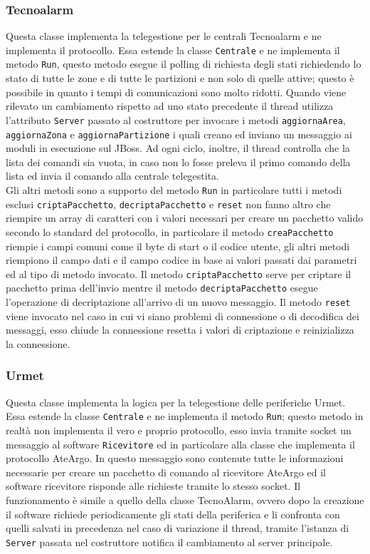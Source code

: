 \subsubsection{Tecnoalarm}
Questa classe implementa la telegestione per le centrali Tecnoalarm e ne implementa il protocollo. Essa estende la classe \texttt{Centrale} e ne implementa il metodo \texttt{Run}, questo metodo esegue il polling di richiesta degli stati richiedendo lo stato di tutte le zone e di tutte le partizioni e non solo di quelle attive; questo è possibile in quanto i tempi di comunicazioni sono molto ridotti. Quando viene rilevato un cambiamento rispetto ad uno stato precedente il thread utilizza l'attributo \texttt{Server} passato al costruttore per invocare i metodi \texttt{aggiornaArea}, \texttt{aggiornaZona} e \texttt{aggiornaPartizione} i quali creano ed inviano un messaggio ai moduli in esecuzione sul JBoss. Ad ogni ciclo, inoltre, il thread controlla che la lista dei comandi sia vuota, in caso non lo fosse preleva il primo comando della lista ed invia il comando alla centrale telegestita.\\
Gli altri metodi sono a supporto del metodo \texttt{Run} in particolare tutti i metodi esclusi \texttt{criptaPacchetto}, \texttt{decriptaPacchetto} e \texttt{reset} non fanno altro che riempire un array di caratteri con i valori necessari per creare un pacchetto valido secondo lo standard del protocollo, in particolare il metodo \texttt{creaPacchetto} riempie i campi comuni come il byte di start o il codice utente, gli altri metodi riempiono il campo dati e il campo codice in base ai valori passati dai parametri ed al tipo di metodo invocato. Il metodo \texttt{criptaPacchetto} serve per criptare il pacchetto prima dell'invio mentre il metodo \texttt{decriptaPacchetto} esegue l'operazione di decriptazione all'arrivo di un nuovo messaggio. Il metodo \texttt{reset} viene invocato nel caso in cui vi siano problemi di connessione o di decodifica dei messaggi, esso chiude la connessione resetta i valori di criptazione e reinizializza la connessione.
\subsubsection{Urmet}
Questa classe implementa la logica per la telegestione delle periferiche Urmet. Essa estende la classe \texttt{Centrale} e ne implementa il metodo \texttt{Run}; questo metodo in realtà non implementa il vero e proprio protocollo, esso invia tramite socket un messaggio al software \texttt{Ricevitore} ed in particolare alla classe che implementa il protocollo AteArgo. In questo messaggio sono contenute tutte le informazioni necessarie per creare un pacchetto di comando al ricevitore AteArgo ed il software ricevitore risponde alle richieste tramite lo stesso socket.
Il funzionamento è simile a quello della classe TecnoAlarm, ovvero dopo la creazione il software richiede periodicamente gli stati della periferica e li confronta con quelli salvati in precedenza nel caso di variazione il thread, tramite l'istanza di \texttt{Server} passata nel costruttore notifica il cambiamento al server principale.

